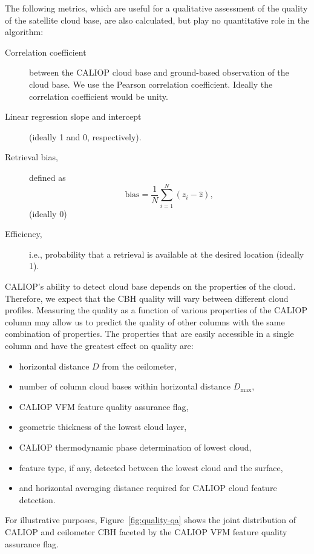 \documentclass[essd,manuscript]{copernicus}\usepackage[]{graphicx}\usepackage[]{color}
\begin{document}
The following metrics, which are useful for a qualitative assessment of the
quality of the satellite cloud base, are also calculated, but play no
quantitative role in the algorithm:
\begin{description}
\item[Correlation coefficient] between the CALIOP cloud base and ground-based
  observation of the cloud base.  We use the Pearson correlation coefficient.
  Ideally the correlation coefficient would be unity.  
\item[Linear regression slope and intercept] (ideally 1 and 0, respectively).  
\item[Retrieval bias,] defined as
  \begin{equation}
    \label{eq:bias}
    \mbox{bias} = \frac{1}{N}\sum\limits_{i = 1}^{N}\left(z_i - \hat{z}\right),
  \end{equation}(ideally 0)
\item[Efficiency,] i.e., probability that a retrieval is available at the
  desired location (ideally 1).
\end{description}

CALIOP's ability to detect cloud base depends on the properties of the cloud.
Therefore, we expect that the CBH quality will vary between
different cloud profiles.  Measuring the quality as a function of various
properties of the CALIOP column may allow us to predict the quality of other
columns with the same combination of properties.  The properties that are easily
accessible in a single column and have the greatest effect on quality are:
\begin{itemize}
\item horizontal distance $D$ from the ceilometer,
\item number of column cloud bases within horizontal distance $D_\text{max}$,
\item CALIOP VFM feature quality assurance flag,
\item geometric thickness of the lowest cloud layer,
\item CALIOP thermodynamic phase determination of lowest cloud,
\item feature type, if any, detected between the lowest cloud and the surface,
\item and horizontal averaging distance required for CALIOP cloud feature
  detection.
\end{itemize}
For illustrative purposes, Figure~\ref{fig:quality-qa} shows the joint
distribution of CALIOP and ceilometer CBH faceted by the CALIOP
VFM feature quality assurance flag.  
\end{document}
